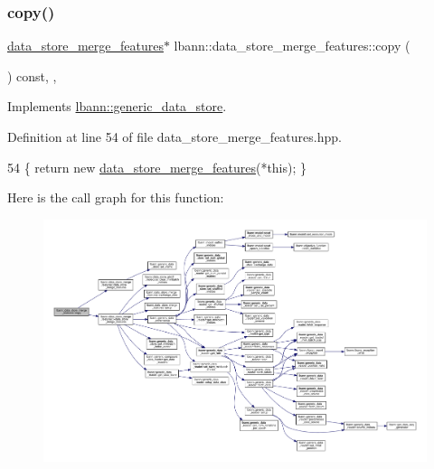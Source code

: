 \subsubsection{\texorpdfstring{copy()}{copy()}}
{\footnotesize\ttfamily \hyperlink{classlbann_1_1data__store__merge__features}{data\+\_\+store\+\_\+merge\+\_\+features}$\ast$ lbann\+::data\+\_\+store\+\_\+merge\+\_\+features\+::copy (\begin{DoxyParamCaption}{ }\end{DoxyParamCaption}) const\hspace{0.3cm}{\ttfamily [inline]}, {\ttfamily [override]}, {\ttfamily [virtual]}}



Implements \hyperlink{classlbann_1_1generic__data__store_ae06e089790aa023b839be508a3c020c6}{lbann\+::generic\+\_\+data\+\_\+store}.



Definition at line 54 of file data\+\_\+store\+\_\+merge\+\_\+features.\+hpp.


\begin{DoxyCode}
54 \{ \textcolor{keywordflow}{return} \textcolor{keyword}{new} \hyperlink{classlbann_1_1data__store__merge__features_a4a2d9d0460f657a38397cf3a48c4d83e}{data\_store\_merge\_features}(*\textcolor{keyword}{this}); \}
\end{DoxyCode}
Here is the call graph for this function\+:\nopagebreak
\begin{figure}[H]
\begin{center}
\leavevmode
\includegraphics[width=350pt]{classlbann_1_1data__store__merge__features_a00a6f7e1f07b5bc65d98c835925d1e08_cgraph}
\end{center}
\end{figure}
\mbox{\label{classlbann_1_1data__store__merge__features_a6a55e3959727a104b4470ba51e0988c3}} 

